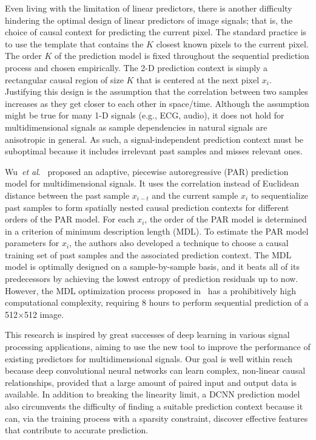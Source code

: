 \documentclass{article}
\newcommand{\etal}{\textit{et al}.}
\begin{document}
Even living with the limitation of linear predictors, there is another difficulty hindering the optimal design of linear predictors of image signals; that is, the choice of causal context for predicting the current pixel.  The standard practice is to use the template that contains the $K$ closest known pixels to the current pixel.
The order $K$ of the prediction model is fixed throughout the sequential prediction process and chosen empirically. The 2-D prediction context is simply a rectangular causal region of size $K$ that is centered at the next pixel $x_i$. Justifying this design is the assumption that the correlation between two samples increases as they get closer to each other in space/time. Although the assumption might be true for many 1-D signals (e.g., ECG, audio), it does not hold for multidimensional signals as sample dependencies in natural signals are anisotropic in general.  As such, a signal-independent prediction context must be suboptimal because it includes irrelevant past samples and misses relevant ones.


Wu~\etal~\cite{MDL-PAR} proposed an adaptive, piecewise autoregressive (PAR) prediction model for multidimensional signals.  It uses the correlation instead of Euclidean distance between the past sample $x_{i-t}$ and the current sample $x_i$ to sequentialize past samples to form spatially nested causal prediction contexts for different orders of the PAR model.
For each $x_i$, the order of the PAR model is determined in a criterion of minimum description length (MDL).  To estimate the PAR model parameters for $x_i$, the authors also developed a technique to choose a causal training set of past samples and the associated prediction context. The MDL model is optimally designed on a sample-by-sample basis, and it beats all of its predecessors by achieving the lowest entropy of prediction residuals up to now.  However, the MDL optimization process proposed in~\cite{MDL-PAR} has a prohibitively high computational complexity, requiring 8 hours to perform sequential prediction of a 512$\times$512 image.

This research is inspired by great successes of deep learning in various signal processing applications, aiming to use the new tool to improve the performance of existing predictors for multidimensional signals.  Our goal is well within reach because deep convolutional neural networks can learn complex, non-linear causal relationships, provided that a large amount of paired input and output data is available.  In addition to breaking the linearity limit, a DCNN prediction model also circumvents the difficulty of finding a suitable prediction context because it can, via the training process with a sparsity constraint, discover effective features that contribute to accurate prediction.
\end{document}
